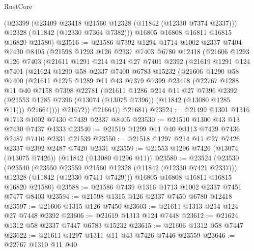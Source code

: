 \begin{lexlean}{RustCore}
\begin{coremodule}
      (@23399
        (@23409 @23418 @21560 @12328 (@11842 (@12330 @7374 @2337)))
        @12328
        (@11842 (@12330 @7364 @7382)))
      @16805
      @16808
      @16811
      @16815
      @16820
      @21580)
@23516 := @21586
    @7392
    @1294
    @1714
    @1002
    @2337
    @7404
    @7430
    @8405
    (@21598
      @1293
      @126
      @2337
      @7403
      @6780
      @12418
      (@21606
        @1293
        @126
        @7403
        (@21611
          @1291
          @214
          @124
          @27
          @7401
          @2392
          (@21619
            @1291
            @124
            @7401
            (@21624
              @1290
              @58
              @2337
              @7400
              @6783
              @15232
              (@21606
                @1290
                @58
                @7400
                (@21611
                  @1275
                  @1289
                  @11
                  @43
                  @7379
                  @7399
                  @23418
                  (@22767
                    @1288
                    @11
                    @40
                    @7158
                    @7398
                    @22781
                    (@21611
                      @1286
                      @214
                      @11
                      @27
                      @7396
                      @2392
                      (@21553 @1285 @7396 (@13074 (@13075 @7396)) (@11842 (@13080 @1285 @11)))
                      @21664))))
              @21672))
          @21664))
      @21681)
@23524 := @21499 @1301 @1316 @1713 @1002 @7430 @7439 @2337 @8405
@23530 := @21510 @1300 @43 @13 @7430 @7437 @4333
@23540 := @21519 @1299 @11 @40 @3113 @7429 @7436 @2487 @7410 @2331 @21539
@23550 := @21518 @1297 @214 @11 @27 @7426 @2337 @2392 @2487 @7420 @2331
@23559 := @21553 @1296 @7426 (@13074 (@13075 @7426)) (@11842 (@13080 @1296 @11))
@23580 := @23524
    (@23530
      (@23540
        (@23550 @23559 @21560 @12328 (@11842 (@12330 @7421 @2337)))
        @12328
        (@11842 (@12330 @7411 @7429)))
      @16805
      @16808
      @16811
      @16815
      @16820
      @21580)
@23588 := @21586 @7439 @1316 @1713 @1002 @2337 @7451 @7477 @8403
@23594 := @21598 @1315 @126 @2337 @7450 @6780 @12418
@23597 := @21606 @1315 @126 @7450
@23603 := @21611 @1313 @214 @124 @27 @7448 @2392
@23606 := @21619 @1313 @124 @7448
@23612 := @21624 @1312 @58 @2337 @7447 @6783 @15232
@23615 := @21606 @1312 @58 @7447
@23622 := @21611 @1297 @1311 @11 @43 @7426 @7446 @23559
@23646 := @22767
    @1310
    @11
    @40

\end{coremodule}
\end{lexlean}
